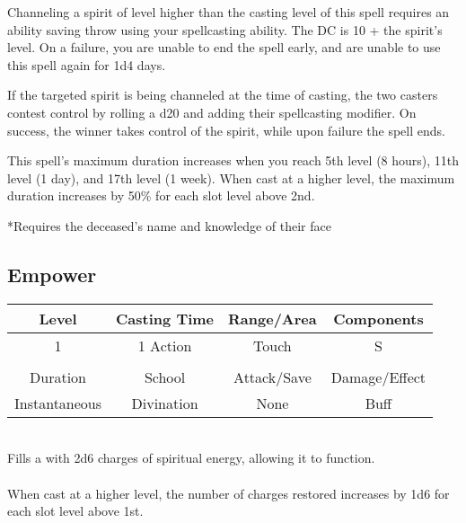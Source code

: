 Channeling a spirit of level higher than the casting level of this spell requires an ability saving throw using your spellcasting ability. The DC is 10 + the spirit's level. On a failure, you are unable to end the spell early, and are unable to use this spell again for 1d4 days.

If the targeted spirit is being channeled at the time of casting, the two casters contest control by rolling a d20 and adding their spellcasting modifier. On success, the winner takes control of the spirit, while upon failure the spell ends.

This spell's maximum duration increases when you reach 5th level (8 hours), 11th level (1 day), and 17th level (1 week). When cast at a higher level, the maximum duration increases by 50\% for each slot level above 2nd.

*Requires the deceased's name and knowledge of their face


\subsection{Empower}
\label{spells:empower}
\begin{tabular}{c|c|c|c}
Level & Casting Time & Range/Area & Components \\\hline
1 & 1 Action & Touch & S \\
\\
Duration & School & Attack/Save & Damage/Effect \\\hline
Instantaneous & Divination & None & Buff \end{tabular}\\
Fills a  with 2d6 charges of spiritual energy, allowing it to function.\\
\\
When cast at a higher level, the number of charges restored increases by 1d6 for each slot level above 1st. 
